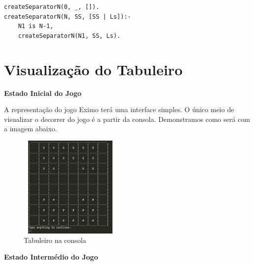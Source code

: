 \documentclass[a4paper]{article}
\begin{document}

\begin{small}
\begin{lstlisting}
createSeparatorN(0, _, []).
createSeparatorN(N, SS, [SS | Ls]):-
	N1 is N-1,
	createSeparatorN(N1, SS, Ls).
\end{lstlisting}
\end{small}


\section{Visualização do Tabuleiro}


\large{\textbf{Estado Inicial do Jogo}}

\begin{small}
A representação do jogo Eximo terá uma interface simples. O único meio de visualizar o decorrer do jogo é a partir da consola. Demonstramos como será com a imagem abaixo.
\begin{figure}[h!]
	\centering
    \includegraphics[height=5cm,width=5cm]{res/mazeBoard.png}
    \caption{Tabuleiro na consola}
    \label{fig:8}
\end{figure}
\end{small}\newline

\large{\textbf{Estado Intermédio do Jogo}}
\end{document}
